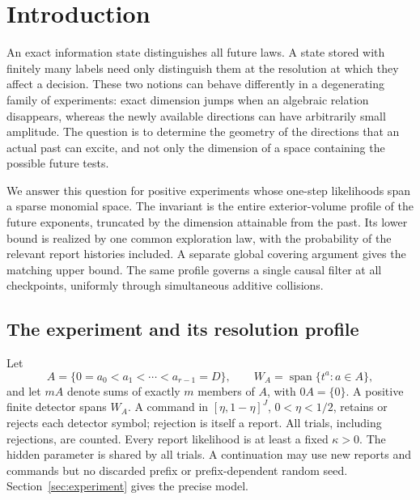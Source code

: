 \section{Introduction}
An exact information state distinguishes all future laws. A state stored
with finitely many labels need only distinguish them at the resolution
at which they affect a decision. These two notions can behave differently
in a degenerating family of experiments: exact dimension jumps when an
algebraic relation disappears, whereas the newly available directions
can have arbitrarily small amplitude. The question is to determine the
geometry of the directions that an actual past can excite, and not only
the dimension of a space containing the possible future tests.

We answer this question for positive experiments whose one-step
likelihoods span a sparse monomial space. The invariant is the entire
exterior-volume profile of the future exponents, truncated by the
dimension attainable from the past. Its lower bound is realized by one
common exploration law, with the probability of the relevant report
histories included. A separate global covering argument gives the
matching upper bound. The same profile governs a single causal filter
at all checkpoints, uniformly through simultaneous additive collisions.

\subsection{The experiment and its resolution profile}
Let
\[
 A=\{0=a_0<a_1<\cdots<a_{r-1}=D\},\qquad
 W_A=\operatorname{span}\{t^a:a\in A\},
\]
and let $mA$ denote sums of exactly $m$ members of $A$, with $0A=\{0\}$.
A positive finite detector spans $W_A$. A command in
$[\eta,1-\eta]^J$, $0<\eta<1/2$, retains or rejects each detector
symbol; rejection is itself a report. All trials, including rejections,
are counted. Every report likelihood is at least a fixed $\kappa>0$.
The hidden parameter is shared by all trials. A continuation may use
new reports and commands but no discarded prefix or prefix-dependent
random seed. Section~\ref{sec:experiment} gives the precise model.

